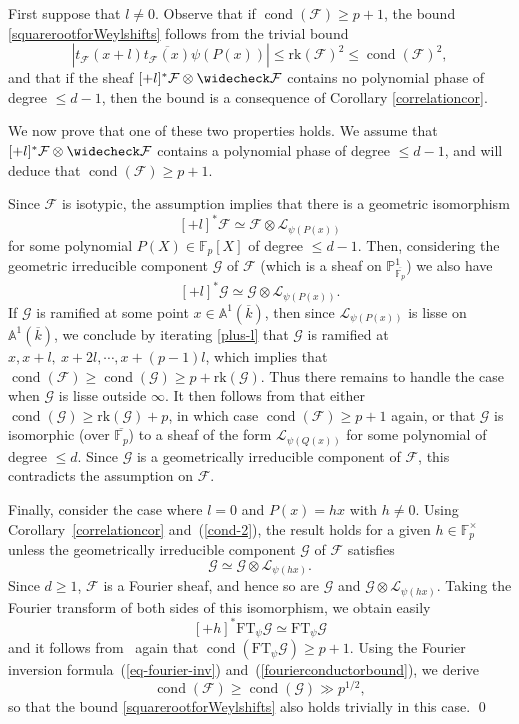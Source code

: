 \documentclass[12pt,a4paper,reqno]{amsart}
\numberwithin{equation}{section}
\DeclareMathOperator*\cond{cond}
\newcommand{\FT}{\mathrm{FT}}
\theoremstyle{plain}
\theoremstyle{definition}
\newcommand\F{\mathbb{F}}
\newcommand\rk{\mathrm{rk}}
\newcommand\ov{\overline}
\newcommand\wcheck{\widecheck}
\newcommand\mcF{\mathcal{F}}
\newcommand\mcG{\mathcal{G}}
\newcommand\mcL{\mathcal{L}}
\newcommand\Pl{\mathbb{P}^1}
\newcommand\Aa{\mathbb{A}}
\newcommand\Fp{\F_{p}}
\newcommand\Fpt{\F_{p}^{\times}}
\begin{document}
\proof First suppose that $l \neq 0$.  Observe that if
$\cond(\mcF)\geq p+1$, the bound \eqref{squarerootforWeylshifts}
follows from the trivial bound 
$$
|t_\mcF(x+l)\ov{t_\mcF(x)}\psi(P(x))|\leq \rk(\mcF)^2\leq \cond(\mcF)^2,
$$
and that if the sheaf $[+l]^*\mcF\otimes\wcheck\mcF$ contains no
polynomial phase of degree $\leq d-1$, then the bound is a consequence
of Corollary \ref{correlationcor}.

We now prove that one of these two properties holds. We assume that
$[+l]^*\mcF\otimes\wcheck\mcF$ contains a polynomial phase of degree
$\leq d-1$, and will deduce that $\cond(\mcF)\geq p+1$. 
\par
Since $\mcF$ is isotypic, the assumption implies that there is a
geometric isomorphism
$$
[+l]^*\mcF\simeq \mcF\otimes\mcL_{\psi(P(x))}
$$
for some polynomial $P(X)\in\Fp[X]$ of degree $\leq d-1$. Then,
considering the geometric irreducible component $\mcG$ of $\mcF$
(which is a sheaf on $\Pl_{\ov{\Fp}}$) we also have
\begin{equation}\label{plus-l}
[+l]^*\mcG\simeq \mcG\otimes\mcL_{\psi(P(x))}.
\end{equation}
If $\mcG$ is ramified at some point $x\in \Aa^1(\ov k)$, then since
$\mcL_{\psi(P(x))}$ is lisse on $\Aa^1(\ov k)$, we conclude by
iterating \eqref{plus-l} that $\mcG$ is ramified at $x,x+l,\
x+2l,\cdots, x+(p-1)l$, which implies that $\cond(\mcF)\geq
\cond(\mcG)\geq p+\rk(\mcG)$. Thus there remains to handle the case
when $\mcG$ is lisse outside $\infty$. It then follows from
\cite[Lemma 5.4 (2)]{FKMGowersnorms} that either $\cond(\mcG)\geq
\rk(\mcG)+p$, in which case $\cond(\mcF)\geq p+1$ again, or that
$\mcG$ is isomorphic (over $\ov{\Fp}$) to a sheaf of the form
$\mcL_{\psi(Q(x))}$ for some polynomial of degree $\leq d$. Since
$\mcG$ is a geometrically irreducible component of $\mcF$, this
contradicts the assumption on $\mcF$.
\par
Finally, consider the case where $l=0$ and $P(x)=hx$ with $h\neq
0$. Using Corollary~\ref{correlationcor} and~(\ref{cond-2}), the
result holds for a given $h\in\Fpt$ unless the geometrically
irreducible component $\mcG$ of $\mcF$ satisfies
$$
\mcG\simeq \mcG\otimes\mcL_{\psi(hx)}.
$$
Since $d\geq 1$, $\mcF$ is a Fourier sheaf, and hence so are $\mcG$
and $\mcG\otimes\mcL_{\psi(hx)}$. Taking the Fourier transform of both
sides of this isomorphism, we obtain easily
$$
[+h]^*\FT_\psi\mcG\simeq \FT_\psi\mcG
$$
and it follows from~\cite[Lemma 5.4 (2)]{FKMGowersnorms} again that
$\cond(\FT_\psi\mcG)\geq p+1$. Using the Fourier inversion
formula~(\ref{eq-fourier-inv}) and~(\ref{fourierconductorbound}), we
derive
$$
\cond(\mcF)\geq \cond(\mcG)\gg p^{1/2},
$$   
so that the bound \eqref{squarerootforWeylshifts} also holds trivially
in this case.
\qed
\end{document}
